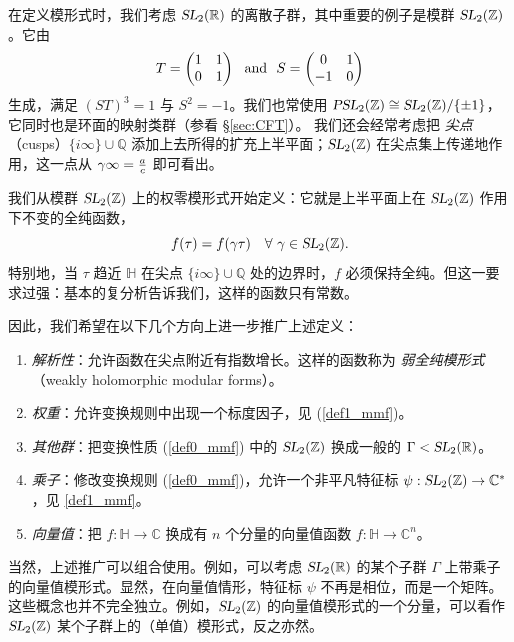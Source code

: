 \documentclass[11pt,a4paper,fontset=windows]{ctexart}
\numberwithin{equation}{section}
\newcommand{\PSL}{\operatorname{\textsl{PSL}}}    %
\newcommand{\SL}{\operatorname{\textsl{SL}}}      %
\newcommand{\CC}{\mathbb{C}}
\newcommand{\RR}{\mathbb{R}}
\newcommand{\QQ}{\mathbb{Q}}
\newcommand{\HH}{\mathbb{H}}
\newcommand{\ZZ}{\mathbb{Z}}
\newcommand{\Z}{\mathbb{Z}}
\def\t{\tau}
\newcommand{\be}{\begin{equation}}
\newcommand{\ee}{\end{equation}}
\newcommand{\bem}{\begin{pmatrix}}
\newcommand{\eem}{\end{pmatrix}}
\begin{document}
在定义模形式时，我们考虑 $\SL_2(\RR)$ 的离散子群，其中重要的例子是模群 $\SL_2(\ZZ)$。它由
\be
T = \bem 1& 1\\ 0&1\eem~~{\rm and}~~ S = \bem 0& 1\\ -1&0 \eem
\ee
生成，满足 $(ST)^3=1$ 与 $S^2=-1$。我们也常使用 $\PSL_2(\ZZ)\cong \SL_2(\ZZ)/\{\pm 1\}$，它同时也是环面的映射类群（参看 \S\ref{sec:CFT}）。
我们还会经常考虑把 {\em 尖点}（cusps）$\{i\infty\} \cup \QQ$ 添加上去所得的扩充上半平面；$\SL_2(\ZZ)$ 在尖点集上传递地作用，这一点从 $\gamma\infty = {a\over c}$ 即可看出。


我们从模群 $\SL_2(\Z)$ 上的权零模形式开始定义：它就是上半平面上在 $\SL_2(\Z)$ 作用下不变的全纯函数，
\be \label{def0_mmf}
f(\t)  =  f(\gamma\t)\quad \forall~ \gamma \in \SL_2(\Z).
\ee
特别地，当 $\t$ 趋近 $\HH$ 在尖点 $\{i\infty\} \cup \QQ$ 处的边界时，$f$ 必须保持全纯。但这一要求过强：基本的复分析告诉我们，这样的函数只有常数。


因此，我们希望在以下几个方向上进一步推广上述定义：
\begin{enumerate}
\item {\it 解析性}：允许函数在尖点附近有指数增长。这样的函数称为 {\it 弱全纯模形式}（weakly holomorphic modular forms）。
\item {\it 权重}：允许变换规则中出现一个标度因子，见 (\ref{def1_mmf})。
\item {\it 其他群}：把变换性质 (\ref{def0_mmf}) 中的 $\SL_2(\Z)$ 换成一般的 $\Gamma < \SL_2(\RR)$。
\item {\it 乘子}：修改变换规则 (\ref{def0_mmf})，允许一个非平凡特征标 $\psi : \SL_2(\Z) \to \CC^\ast$，见 \eqref{def1_mmf}。
\item {\it 向量值}：把 $f: \HH \to \CC$ 换成有 $n$ 个分量的向量值函数 $f: \HH \to \CC^n$。
\end{enumerate}

当然，上述推广可以组合使用。例如，可以考虑 $\SL_2(\RR)$ 的某个子群 $\Gamma$ 上带乘子的向量值模形式。显然，在向量值情形，特征标 $\psi$ 不再是相位，而是一个矩阵。
这些概念也并不完全独立。例如，$\SL_2(\Z)$ 的向量值模形式的一个分量，可以看作 $\SL_2(\Z)$ 某个子群上的（单值）模形式，反之亦然。
\end{document}
